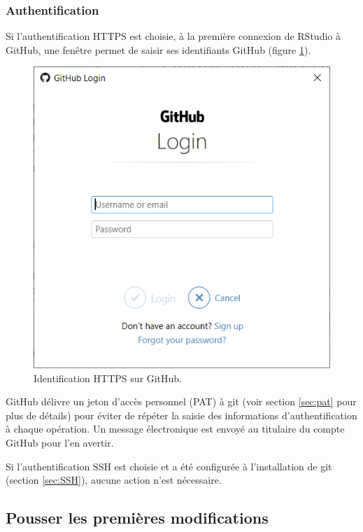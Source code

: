 \documentclass[
  12pt,
  french,
  a4paper,
  extrafontsizes,onecolumn,openright
  ]{memoir}
\begin{document}
\hypertarget{authentification}{%
\subsubsection{Authentification}\label{authentification}}

Si l'authentification HTTPS est choisie, à la première connexion de RStudio à GitHub, une fenêtre permet de saisir ses identifiants GitHub (figure \ref{fig:git-PAT}).



\scriptsize

\begin{figure}

{\centering \includegraphics[width=0.8\linewidth]{images/git-PAT} 

}

\caption{Identification HTTPS sur GitHub.}\label{fig:git-PAT}
\end{figure}

\normalsize

GitHub délivre un jeton d'accès personnel (PAT) à git (voir section \ref{sec:pat} pour plus de détails) pour éviter de répéter la saisie des informations d'authentification à chaque opération.
Un message électronique est envoyé au titulaire du compte GitHub pour l'en avertir.

Si l'authentification SSH est choisie et a été configurée à l'installation de git (section \ref{sec:SSH}), aucune action n'est nécessaire.

\hypertarget{pousser-les-premiuxe8res-modifications}{%
\subsection{Pousser les premières modifications}\label{pousser-les-premiuxe8res-modifications}}
\end{document}
